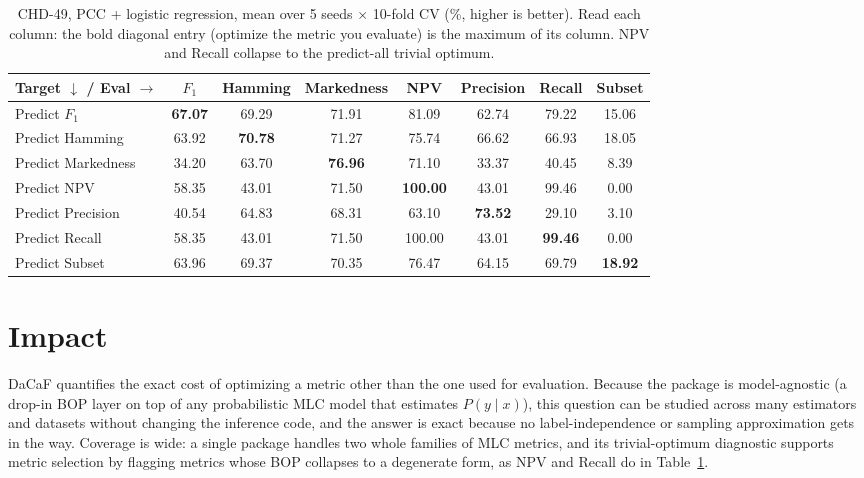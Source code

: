 \documentclass[11pt, letterpaper]{article}
\begin{document}
\begin{table}[t]
\centering
\caption{CHD-49, PCC + logistic regression, mean over 5 seeds $\times$ 10-fold CV
(\%, higher is better). Read each column: the bold diagonal entry (optimize the
metric you evaluate) is the maximum of its column. NPV and Recall collapse to the
predict-all trivial optimum.}
\label{tab:chd49}
\footnotesize
\setlength{\tabcolsep}{4pt}
\begin{tabular}{@{}lccccccc@{}}
\toprule
Target $\downarrow$ / Eval $\rightarrow$ & $F_1$ & Hamming & Markedness & NPV & Precision & Recall & Subset \\
\midrule
Predict $F_1$       & \textbf{67.07} & 69.29 & 71.91 & 81.09 & 62.74 & 79.22 & 15.06 \\
Predict Hamming     & 63.92 & \textbf{70.78} & 71.27 & 75.74 & 66.62 & 66.93 & 18.05 \\
Predict Markedness  & 34.20 & 63.70 & \textbf{76.96} & 71.10 & 33.37 & 40.45 & 8.39 \\
Predict NPV         & 58.35 & 43.01 & 71.50 & \textbf{100.00} & 43.01 & 99.46 & 0.00 \\
Predict Precision   & 40.54 & 64.83 & 68.31 & 63.10 & \textbf{73.52} & 29.10 & 3.10 \\
Predict Recall      & 58.35 & 43.01 & 71.50 & 100.00 & 43.01 & \textbf{99.46} & 0.00 \\
Predict Subset      & 63.96 & 69.37 & 70.35 & 76.47 & 64.15 & 69.79 & \textbf{18.92} \\
\bottomrule
\end{tabular}
\end{table}

\section{Impact}\label{sec:impact}
DaCaF quantifies the exact cost of optimizing a metric other than the one used for
evaluation. Because the package is model-agnostic (a drop-in BOP layer on
top of any probabilistic MLC model that estimates $P(y\mid x)$), this question can be
studied across many estimators and datasets without changing the inference code, and the
answer is exact because no label-independence or sampling approximation gets in the way.
Coverage is wide: a single package handles two whole families of MLC metrics, and its
trivial-optimum diagnostic supports metric selection by flagging metrics whose BOP
collapses to a degenerate form, as NPV and Recall do in Table~\ref{tab:chd49}.
\end{document}
